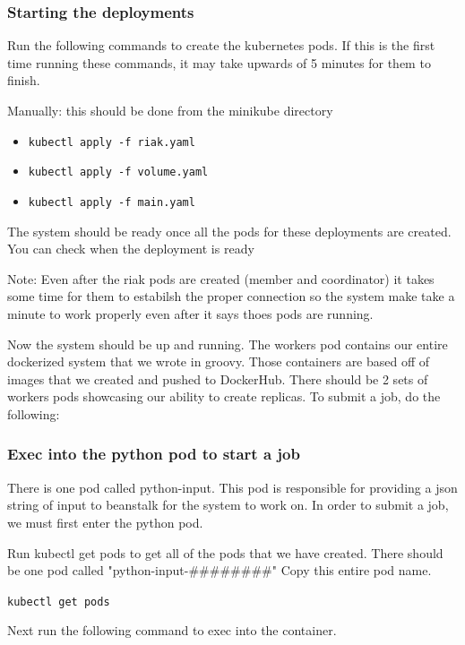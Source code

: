 \documentclass[onecolumn, draftclsnofoot,10pt, compsoc]{IEEEtran}
\begin{document}
\subsubsection*{Starting the
deployments}\label{starting-the-deployments}

Run the following commands to create the kubernetes pods. If this is the
first time running these commands, it may take upwards of 5 minutes for
them to finish.

Manually: this should be done from the minikube directory

\begin{itemize}
\item
  \texttt{kubectl\ apply\ -f\ riak.yaml}
\item
  \texttt{kubectl\ apply\ -f\ volume.yaml}
\item
  \texttt{kubectl\ apply\ -f\ main.yaml}
\end{itemize}

The system should be ready once all the pods for these deployments are
created. You can check when the deployment is ready

Note: Even after the riak pods are created (member and coordinator) it
takes some time for them to estabilsh the proper connection so the
system make take a minute to work properly even after it says thoes pods
are running.

Now the system should be up and running. The workers pod contains our
entire dockerized system that we wrote in groovy. Those containers are
based off of images that we created and pushed to DockerHub. There
should be 2 sets of workers pods showcasing our ability to create
replicas. To submit a job, do the following:

\subsubsection*{Exec into the python pod to start a
job}\label{exec-into-the-python-pod-to-start-a-job}

There is one pod called python-input. This pod is responsible for
providing a json string of input to beanstalk for the system to work on.
In order to submit a job, we must first enter the python pod.

Run kubectl get pods to get all of the pods that we have created. There
should be one pod called "python-input-\#\#\#\#\#\#\#\#" Copy this
entire pod name.

\texttt{kubectl\ get\ pods}

Next run the following command to exec into the container.
\end{document}
